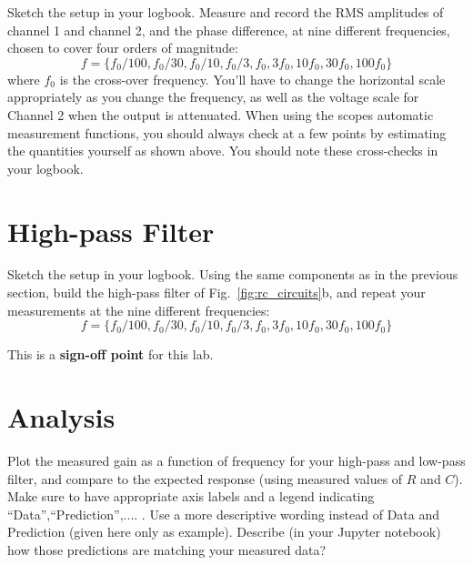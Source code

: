 \begin{measurement} 
Sketch the setup in your logbook. Measure and record the RMS amplitudes of channel 1 and channel 2, and the phase difference, at 
nine different frequencies, chosen to cover four orders of magnitude:
\begin{displaymath}
f=\{f_0/100, f_0/30, f_0/10, f_0/3,f_0, 3f_0, 10f_0, 30f_0, 100f_0\}
\end{displaymath}
where $f_0$ is the cross-over frequency.  You'll have to change the
horizontal scale appropriately as you change the frequency, as well as
the voltage scale for Channel 2 when the output is attenuated.  When
using the scopes automatic measurement functions, you should always
check at a few points by estimating the quantities yourself as shown
above.  You should note these cross-checks in your logbook. \end{measurement}

\section{High-pass Filter}

\begin{measurement} Sketch the setup in your logbook. Using the same components as in the previous section, build the
high-pass filter of Fig.~\ref{fig:rc_circuits}b, and repeat your
measurements at the nine different frequencies:
\begin{displaymath}
f=\{f_0/100, f_0/30, f_0/10, f_0/3,f_0, 3f_0, 10f_0, 30f_0, 100f_0\}
\end{displaymath}
\end{measurement}


\noindent
This is a \textbf{sign-off point} for this lab.

\section{Analysis}

\begin{plot} Plot the measured gain as a function of frequency for your high-pass
and low-pass filter, and compare to the expected response (using measured values of $R$ and $C$). 
Make sure to have
appropriate axis labels and a legend indicating ``Data'',``Prediction'',.... .
Use a more descriptive wording instead of Data and Prediction (given here only as example). 
Describe (in your Jupyter notebook) how those predictions are matching your measured data? \end{plot}

